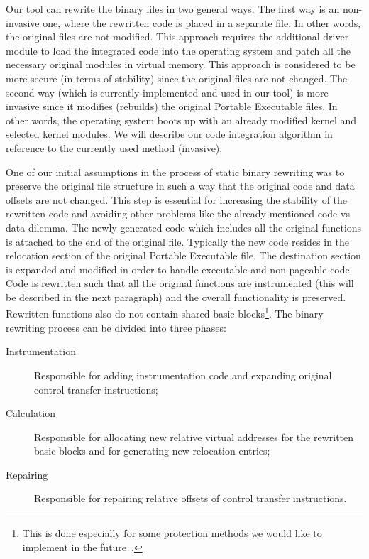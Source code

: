 \documentclass[10pt,twocolumn,a4paper]{article}
\begin{document}
Our tool can rewrite the binary files in two general ways. The first way is an non-invasive one, where the rewritten code is placed in a separate file. In other words, the original files are not modified. This approach requires the additional driver module to load the integrated code into the operating system and patch all the necessary original modules in virtual memory. This approach is considered to be more secure (in terms of stability) since the original files are not changed. The second way (which is currently implemented and used in our tool) is more invasive since it modifies (rebuilds) the original Portable Executable files. In other words, the operating system boots up with an already modified kernel and selected kernel modules. We will describe our code integration algorithm in reference to the currently used method (invasive).

One of our initial assumptions in the process of static binary rewriting was to preserve the original file structure in such a way that the original code and data offsets are not changed. This step is essential for increasing the stability of the rewritten code and avoiding other problems like the already mentioned code vs data dilemma. The newly generated code which includes all the original functions is attached to the end of the original file. Typically the new code resides in the relocation section of the original Portable Executable file. The destination section is expanded and modified in order to handle executable and non-pageable code. Code is rewritten such that all the original functions are instrumented (this will be described in the next paragraph) and the overall functionality is preserved. Rewritten functions also do not contain shared basic blocks\footnote{This is done especially for some protection methods we would like to implement in the future~\cite{PaxFuture, RopArticlePB}.}. The binary rewriting process can be divided into three phases:

\begin{description}
    \item[Instrumentation] Responsible for adding instrumentation code and expanding original control transfer instructions;
    \item[Calculation] Responsible for allocating new relative virtual addresses for the rewritten basic blocks and for generating new relocation entries;
    \item[Repairing] Responsible for repairing relative offsets of control transfer instructions.
\end{description}
\end{document}

